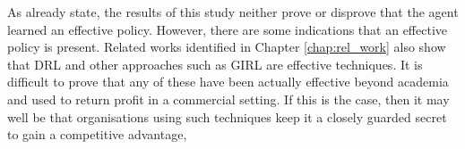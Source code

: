 \documentclass[oneside,12pt]{Classes/RoboticsLaTeX}
\begin{document}
As already state, the results of this study neither prove or disprove that the agent learned an effective policy. However, there are some indications that an effective policy is present. Related works identified in Chapter \ref{chap:rel_work} also show that DRL and other approaches such as GIRL are effective techniques. It is difficult to prove that any of these have been actually effective beyond academia and used to return profit in a commercial setting. If this is the case, then it may well be that organisations using such techniques keep it a closely guarded secret to gain a competitive advantage,



\renewcommand{\bibname}{References}           %


%
\end{document}
